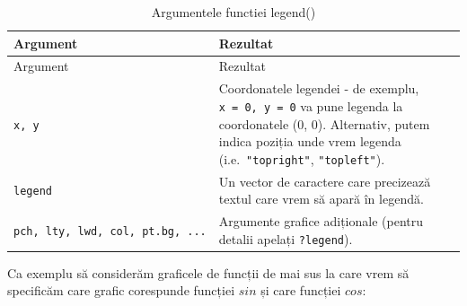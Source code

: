 \documentclass[]{article}
\begin{document}
\begin{longtable}[]{@{}ll@{}}
\caption{Argumentele functiei legend()}\tabularnewline
\toprule
\begin{minipage}[b]{0.15\columnwidth}\raggedright
Argument\strut
\end{minipage} & \begin{minipage}[b]{0.79\columnwidth}\raggedright
Rezultat\strut
\end{minipage}\tabularnewline
\midrule
\endfirsthead
\toprule
\begin{minipage}[b]{0.15\columnwidth}\raggedright
Argument\strut
\end{minipage} & \begin{minipage}[b]{0.79\columnwidth}\raggedright
Rezultat\strut
\end{minipage}\tabularnewline
\midrule
\endhead
\begin{minipage}[t]{0.15\columnwidth}\raggedright
\texttt{x,\ y}\strut
\end{minipage} & \begin{minipage}[t]{0.79\columnwidth}\raggedright
Coordonatele legendei - de exemplu, \texttt{x\ =\ 0,\ y\ =\ 0} va pune
legenda la coordonatele (0, 0). Alternativ, putem indica poziția unde
vrem legenda (i.e.~\texttt{"topright"}, \texttt{"topleft"}).\strut
\end{minipage}\tabularnewline
\begin{minipage}[t]{0.15\columnwidth}\raggedright
\texttt{legend}\strut
\end{minipage} & \begin{minipage}[t]{0.79\columnwidth}\raggedright
Un vector de caractere care precizează textul care vrem să apară în
legendă.\strut
\end{minipage}\tabularnewline
\begin{minipage}[t]{0.15\columnwidth}\raggedright
\texttt{pch,\ lty,\ lwd,\ col,\ pt.bg,\ ...}\strut
\end{minipage} & \begin{minipage}[t]{0.79\columnwidth}\raggedright
Argumente grafice adiționale (pentru detalii apelați
\texttt{?legend}).\strut
\end{minipage}\tabularnewline
\bottomrule
\end{longtable}

Ca exemplu să considerăm graficele de funcții de mai sus la care vrem să
specificăm care grafic corespunde funcției \(sin\) și care funcției
\(cos\):
\end{document}
